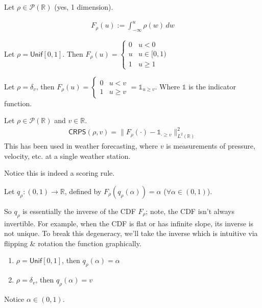\documentclass[11pt,fleqn]{article}
\numberwithin{equation}{section}
\theoremstyle{definition}
\theoremstyle{definition}
\begin{document}
Let $\rho \in \mathcal P(\mathbb R)$ (yes, 1 dimension).
\begin{definition}
	\begin{align}
		F_\rho(u) := \int_{-\infty}^u \rho(w) \, dw
	\end{align}
\end{definition}
\begin{eg}
	Let $\rho = \textsf{Unif}[0,1]$. Then $F_\rho(u) = \begin{cases}
		0 & u <0\\
		u& u \in [0, 1)\\
		1 & u \geq 1
	\end{cases}$
\end{eg}
\begin{eg}
	Let $\rho = \delta_v$, then $F_\rho(u) = \begin{cases}
		0& u < v\\
		1 & u \geq v
	\end{cases} = \mathds 1_{u \geq v}$. Where $\mathds 1$ is the indicator function.
\end{eg}

\begin{definition}
	 Let $\rho \in \mathcal P(\mathbb R)$ and $v \in \mathbb R$.
	\begin{align}
		\textsf{CRPS}(\rho, v) = \| F_\rho(\cdot) - \mathds 1_{\cdot \geq v}\|^2_{L^2(\mathbb R)}
	\end{align}
	This has been used in weather forecasting, where $v$ is measurements of pressure, velocity, etc. at a single weather station.
\end{definition}
Notice this is indeed a scoring rule.
\begin{definition}
	 Let $q_\rho: (0,1) \to \mathbb R$, defined by $F_\rho(q_\rho(\alpha)) = \alpha$ ($\forall \alpha \in (0,1)$). 
\end{definition}
So $q_\rho$ is essentially the inverse of the CDF $F_\rho$; note, the CDF isn't always invertible. For example, when the CDF is flat or has infinite slope, its inverse is not unique. To break this degeneracy, we'll take the inverse which is intuitive via flipping \& rotation the function graphically.
\begin{eg} 	\begin{enumerate}
		\item $\rho = \textsf{Unif}[0,1]$, then $q_\rho(\alpha) = \alpha$
		\item $\rho = \delta_v$, then $q_\rho(\alpha) = v$
	\end{enumerate}
	Notice $\alpha \in (0,1)$.
\end{eg}
\end{document}

